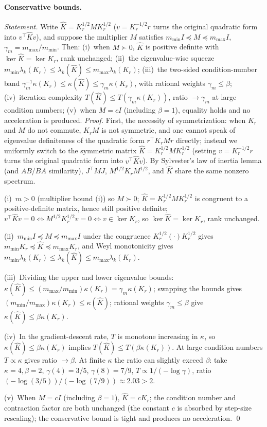 \documentclass[11pt]{article}
\numberwithin{equation}{section}
\begin{document}
\paragraph{Conservative bounds.}
\emph{Statement.} Write $\widehat K=K_r^{1/2}M K_r^{1/2}$ ($v=K_r^{-1/2}r$ turns the original quadratic form into $v^\top\widehat K v$), and suppose the multiplier $M$ satisfies $m_{\min}I\preceq M\preceq m_{\max}I$, $\gamma_m=m_{\max}/m_{\min}$. Then: (i)~when $M\succ0$, $\widehat K$ is positive definite with $\ker\widehat K=\ker K_r$, rank unchanged; (ii)~the eigenvalue-wise squeeze $m_{\min}\lambda_k(K_r)\le\lambda_k(\widehat K)\le m_{\max}\lambda_k(K_r)$; (iii)~the two-sided condition-number band $\gamma_m^{-1}\kappa(K_r)\le\kappa(\widehat K)\le\gamma_m\kappa(K_r)$, with rational weights $\gamma_m\le\beta$; (iv)~iteration complexity $T(\widehat K)\le T(\gamma_m\kappa(K_r))$, ratio $\to\gamma_m$ at large condition numbers; (v)~when $M=cI$ (including $\beta=1$), equality holds and no acceleration is produced.
\emph{Proof.} First, the necessity of symmetrization: when $K_r$ and $M$ do not commute, $K_rM$ is not symmetric, and one cannot speak of eigenvalue definiteness of the quadratic form $r^\top K_rM r$ directly; instead we uniformly switch to the symmetric matrix $\widehat K=K_r^{1/2}M K_r^{1/2}$ (setting $v=K_r^{-1/2}r$ turns the original quadratic form into $v^\top\widehat K v$). By Sylvester's law of inertia lemma (and $AB$/$BA$ similarity), $J^\top M J$, $M^{1/2}K_rM^{1/2}$, and $\widehat K$ share the same nonzero spectrum.
\par\noindent(i)~$m>0$ (multiplier bound (i)) so $M\succ0$; $\widehat K=K_r^{1/2}M K_r^{1/2}$ is congruent to a positive-definite matrix, hence still positive definite; $v^\top\widehat K v=0\iff M^{1/2}K_r^{1/2}v=0\iff v\in\ker K_r$, so $\ker\widehat K=\ker K_r$, rank unchanged.
\par\noindent(ii)~$m_{\min}I\preceq M\preceq m_{\max}I$ under the congruence $K_r^{1/2}(\cdot)K_r^{1/2}$ gives $m_{\min}K_r\preceq\widehat K\preceq m_{\max}K_r$, and Weyl monotonicity gives $m_{\min}\lambda_k(K_r)\le\lambda_k(\widehat K)\le m_{\max}\lambda_k(K_r)$.
\par\noindent(iii)~Dividing the upper and lower eigenvalue bounds: $\kappa(\widehat K)\le(m_{\max}/m_{\min})\kappa(K_r)=\gamma_m\kappa(K_r)$; swapping the bounds gives $(m_{\min}/m_{\max})\kappa(K_r)\le\kappa(\widehat K)$; rational weights $\gamma_m\le\beta$ give $\kappa(\widehat K)\le\beta\kappa(K_r)$.
\par\noindent(iv)~In the gradient-descent rate, $T$ is monotone increasing in $\kappa$, so $\kappa(\widehat K)\le\beta\kappa(K_r)$ implies $T(\widehat K)\le T(\beta\kappa(K_r))$. At large condition numbers $T\propto\kappa$ gives ratio $\to\beta$. At finite $\kappa$ the ratio can slightly exceed $\beta$: take $\kappa=4,\beta=2$, $\gamma(4)=3/5$, $\gamma(8)=7/9$, $T\propto1/(-\log\gamma)$, ratio $(-\log(3/5))/(-\log(7/9))\approx2.03>2$.
\par\noindent(v)~When $M=cI$ (including $\beta=1$), $\widehat K=cK_r$; the condition number and contraction factor are both unchanged (the constant $c$ is absorbed by step-size rescaling); the conservative bound is tight and produces no acceleration. \qed
\end{document}
